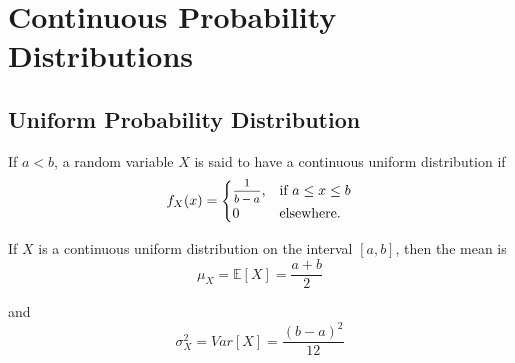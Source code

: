 \section{Continuous Probability Distributions}

\subsection{Uniform Probability Distribution}

\begin{definition}
    If $a < b$, a random variable $X$ is said to have a continuous uniform distribution if 
    \begin{equation}
        f_X(x) = \begin{cases}
            \mfrac{1}{b - a}, & \text{if } a \leq x \leq b\\
            0 & \text{elsewhere}.
        \end{cases}
    \end{equation}
\end{definition}

\begin{theorem}
    If $X$ is a continuous uniform distribution on the interval $[a,b]$, then the mean is
    \begin{equation}
        \mu_X = \mathbb{E}[X] = \frac{a + b}{2}
    \end{equation}

    and 
    \begin{equation}
        \sigma^2_X = Var[X] = \frac{(b - a)^2}{12}
    \end{equation}
\end{theorem}

